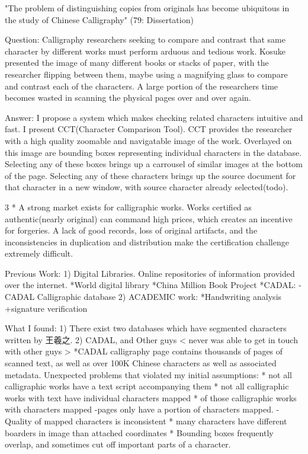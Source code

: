 

"The problem of distinguishing copies from originals has become ubiquitous in the study of Chinese Calligraphy" (79: Dissertation)

    Question:  Calligraphy researchers seeking to compare and contrast that same character by different works must perform arduous and tedious work.
                Kosuke presented the image of many different books or stacks of paper, with the researcher flipping between them,  maybe using a magnifying glass to compare and contrast each of the characters.  A large portion of the researchers time becomes wasted in scanning the physical pages over and over again.


    Answer:  I propose a system which makes checking related characters intuitive and fast.  I present CCT(Character Comparison Tool).  CCT provides the researcher with a high quality zoomable and navigatable image of the work.  Overlayed on this image are bounding boxes representing individual characters in the database.  Selecting any of these boxes brings up a carrousel of similar images at the bottom of the page.  Selecting any of these characters brings up the source document for that character in a new window, with source character already selected(todo).  

3
    *  A strong market exists for calligraphic works.  Works certified as authentic(nearly original) can command high prices, which creates an incentive for forgeries.  A lack of good records, loss of original artifacts, and the inconsistencies in duplication and distribution make the certification challenge extremely difficult.
    
Previous Work:
    1) Digital Libraries.  Online repositories of information provided over the internet.
        *World digital library
        *China Million Book Project
            *CADAL:
                -CADAL Calligraphic database
    2) ACADEMIC work:
        *Handwriting analysis
            +signature verification
            

What I found:
    1)  There exist two databases which have segmented characters written by 王羲之.
    2)  CADAL, and Other guys < never was able to get in touch with other guys >
        *CADAL calligraphy page contains thousands of pages of scanned text, as well as over 100K Chinese characters as well as associated metadata.
    Unexpected problems that violated my initial assumptions:
        * not all calligraphic works have a text script accompanying them
        * not all calligraphic works with text have individual characters mapped
        * of those calligraphic works with characters mapped
            -pages only have a portion of characters mapped.
            -Quality of mapped characters is inconsistent
                * many characters have different boarders in image than attached coordinates
                * Bounding boxes frequently overlap, and sometimes cut off important parts of a character.

